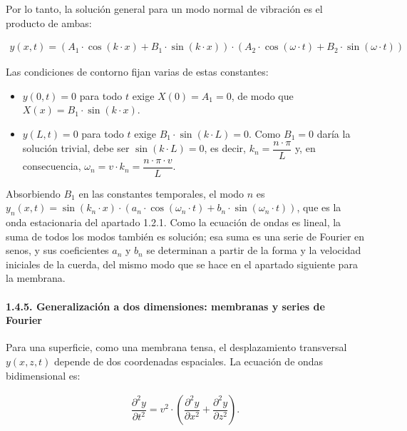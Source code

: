 \documentclass[
  spanish,
]{article}
\providecommand{\tightlist}{%
  \setlength{\itemsep}{0pt}\setlength{\parskip}{0pt}}
\begin{document}
Por lo tanto, la solución general para un modo normal de vibración es el
producto de ambas:

\[
\begin{aligned}
y(x,t) = \left( A_1 \cdot \cos(k \cdot x) + B_1 \cdot \sin(k \cdot x) \right) \cdot \left( A_2 \cdot \cos(\omega \cdot t) + B_2 \cdot \sin(\omega \cdot t) \right)
\end{aligned}
\]

Las condiciones de contorno fijan varias de estas constantes:

\begin{itemize}
\tightlist
\item
  \(y(0,t) = 0\) para todo \(t\) exige \(X(0) = A_1 = 0\), de modo que
  \(X(x) = B_1 \cdot \sin(k \cdot x)\).
\item
  \(y(L,t) = 0\) para todo \(t\) exige
  \(B_1 \cdot \sin(k \cdot L) = 0\). Como \(B_1 = 0\) daría la solución
  trivial, debe ser \(\sin(k \cdot L) = 0\), es decir,
  \(k_n = \dfrac{n \cdot \pi}{L}\) y, en consecuencia,
  \(\omega_n = v \cdot k_n = \dfrac{n \cdot \pi \cdot v}{L}\).
\end{itemize}

Absorbiendo \(B_1\) en las constantes temporales, el modo \(n\) es
\(y_n(x,t) = \sin(k_n \cdot x) \cdot \left( a_n \cdot \cos(\omega_n \cdot t) + b_n \cdot \sin(\omega_n \cdot t) \right)\),
que es la onda estacionaria del apartado 1.2.1. Como la ecuación de
ondas es lineal, la suma de todos los modos también es solución; esa
suma es una serie de Fourier en senos, y sus coeficientes \(a_n\) y
\(b_n\) se determinan a partir de la forma y la velocidad iniciales de
la cuerda, del mismo modo que se hace en el apartado siguiente para la
membrana.

\paragraph{1.4.5. Generalización a dos dimensiones: membranas y series
de
Fourier}\label{generalizaciuxf3n-a-dos-dimensiones-membranas-y-series-de-fourier}

Para una superficie, como una membrana tensa, el desplazamiento
transversal \(y(x,z,t)\) depende de dos coordenadas espaciales. La
ecuación de ondas bidimensional es:

\[
\begin{aligned}
\dfrac{\partial^2 y}{\partial t^2}
= v^2 \cdot \left( \dfrac{\partial^2 y}{\partial x^2} + \dfrac{\partial^2 y}{\partial z^2} \right).
\end{aligned}
\]
\end{document}

